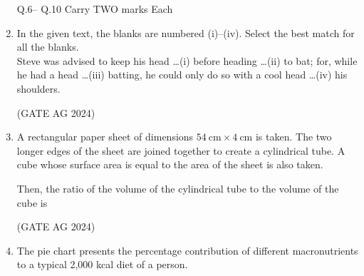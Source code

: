 \documentclass[journal]{IEEEtran}
\begin{document}
\begin{enumerate}
\medskip

\noindent
Q.6\quad -- Q.10 Carry TWO marks Each

\item 
In the given text, the blanks are numbered (i)--(iv). Select the best match for all the blanks.\\

Steve was advised to keep his head \dots (i) before heading \dots (ii) to bat; for, while he had a head \dots (iii) batting, he could only do so with a cool head \dots (iv) his shoulders.

\begin{enumerate}
\end{enumerate}
 \hfill(GATE AG 2024)\\

 \medskip

\item 
A rectangular paper sheet of dimensions $54~\text{cm} \times 4~\text{cm}$ is taken. The two longer edges of the sheet are joined together to create a cylindrical tube. A cube whose surface area is equal to the area of the sheet is also taken.

Then, the ratio of the volume of the cylindrical tube to the volume of the cube is

\begin{enumerate}
\end{enumerate}
 \hfill(GATE AG 2024)\\

 \medskip

\item 
The pie chart presents the percentage contribution of different macronutrients to a typical 2,000 kcal diet of a person.


\end{enumerate}
\end{document}
